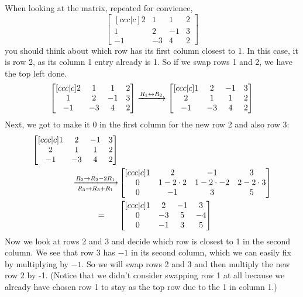 \documentclass[12pt]{scrartcl}
\begin{document}
When looking at the matrix, repeated for convience,
\[\begin{bmatrix}[ccc|c]
    2 & 1 & 1 & 2 \\
    1 & 2 & -1 & 3 \\
    -1 & -3 & 4 & 2
\end{bmatrix}\]
you should think about which row has its first column closest to 1. In this case, it is row 2, as its column 1 entry already is 1. So if we swap rows 1 and 2, we have the top left done.
\[
    \begin{bmatrix}[ccc|c]
        2 & 1 & 1 & 2 \\
        1 & 2 & -1 & 3 \\
        -1 & -3 & 4 & 2
    \end{bmatrix}
    \xto[R_1 \lrto R_2]
    \begin{bmatrix}[ccc|c]
        1 & 2 & -1 & 3 \\
        2 & 1 & 1 & 2 \\
        -1 & -3 & 4 & 2
    \end{bmatrix}
\]
Next, we got to make it 0 in the first column for the new row 2 and also row 3:
\begin{align*}
    \begin{bmatrix}[ccc|c]
        1 & 2 & -1 & 3 \\
        2 & 1 & 1 & 2 \\
        -1 & -3 & 4 & 2
    \end{bmatrix}&\\
    \xto[R_2 \to R_2 - 2R_1][R_3 \to R_3 + R_1]&
    \begin{bmatrix}[ccc|c]
        1 & 2 & -1 & 3 \\
        0 & 1 - 2 \cdot 2 & 1 - 2 \cdot -2 & 2 - 2 \cdot 3 \\
        0 & -1 & 3 & 5
    \end{bmatrix} \\
    =\quad\:\:\: &
    \begin{bmatrix}[ccc|c]
        1 & 2 & -1 & 3 \\
        0 & -3 & 5 & -4 \\
        0 & -1 & 3 & 5
    \end{bmatrix}
\end{align*}
Now we look at rows 2 and 3 and decide which row is closest to 1 in the second column. We see that row 3 has $-1$ in its second column, which we can easily fix by multiplying by $-1.$ So we will swap rows 2 and 3 and then multiply the new row 2 by -1. (Notice that we didn't consider swapping row 1 at all because we already have chosen row 1 to stay as the top row due to the 1 in column 1.)
\end{document}
